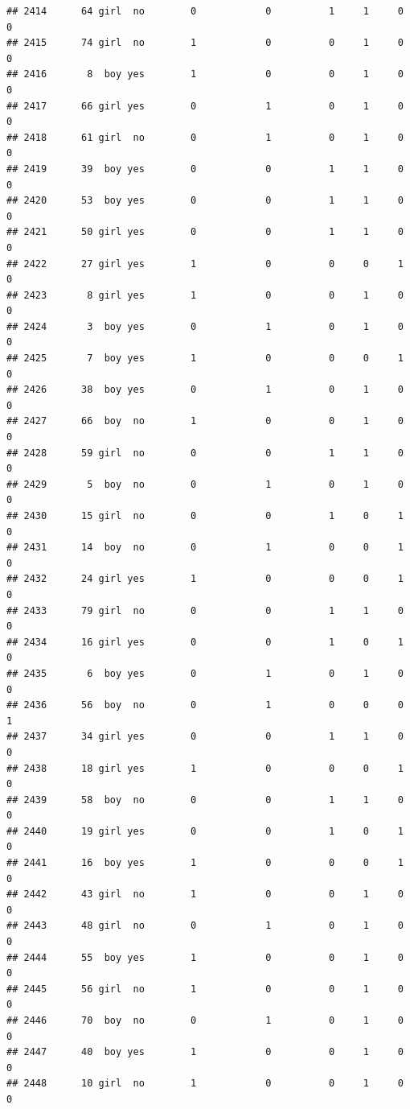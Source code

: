 \documentclass[man]{apa6}
\begin{document}
\begin{verbatim}
## 2414      64 girl  no        0            0          1     1     0     0
## 2415      74 girl  no        1            0          0     1     0     0
## 2416       8  boy yes        1            0          0     1     0     0
## 2417      66 girl yes        0            1          0     1     0     0
## 2418      61 girl  no        0            1          0     1     0     0
## 2419      39  boy yes        0            0          1     1     0     0
## 2420      53  boy yes        0            0          1     1     0     0
## 2421      50 girl yes        0            0          1     1     0     0
## 2422      27 girl yes        1            0          0     0     1     0
## 2423       8 girl yes        1            0          0     1     0     0
## 2424       3  boy yes        0            1          0     1     0     0
## 2425       7  boy yes        1            0          0     0     1     0
## 2426      38  boy yes        0            1          0     1     0     0
## 2427      66  boy  no        1            0          0     1     0     0
## 2428      59 girl  no        0            0          1     1     0     0
## 2429       5  boy  no        0            1          0     1     0     0
## 2430      15 girl  no        0            0          1     0     1     0
## 2431      14  boy  no        0            1          0     0     1     0
## 2432      24 girl yes        1            0          0     0     1     0
## 2433      79 girl  no        0            0          1     1     0     0
## 2434      16 girl yes        0            0          1     0     1     0
## 2435       6  boy yes        0            1          0     1     0     0
## 2436      56  boy  no        0            1          0     0     0     1
## 2437      34 girl yes        0            0          1     1     0     0
## 2438      18 girl yes        1            0          0     0     1     0
## 2439      58  boy  no        0            0          1     1     0     0
## 2440      19 girl yes        0            0          1     0     1     0
## 2441      16  boy yes        1            0          0     0     1     0
## 2442      43 girl  no        1            0          0     1     0     0
## 2443      48 girl  no        0            1          0     1     0     0
## 2444      55  boy yes        1            0          0     1     0     0
## 2445      56 girl  no        1            0          0     1     0     0
## 2446      70  boy  no        0            1          0     1     0     0
## 2447      40  boy yes        1            0          0     1     0     0
## 2448      10 girl  no        1            0          0     1     0     0

\end{verbatim}
\end{document}
